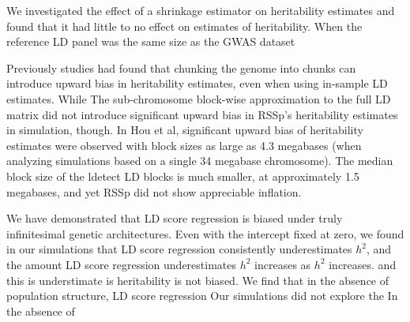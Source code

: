 We investigated the effect of a shrinkage estimator on heritability estimates and found that it had little to no effect on estimates of heritability.  When the reference LD panel was the same size as the GWAS dataset

Previously studies had found that chunking the genome into chunks can introduce upward bias in heritability estimates, even when using in-sample LD estimates\cite{Hou_2019}.  While   The sub-chromosome block-wise approximation to the full LD matrix did not introduce significant upward bias in RSSp's heritability estimates in simulation, though.   In Hou et al, significant upward bias of heritability estimates were observed with block sizes as large as 4.3 megabases (when analyzing simulations based on a single 34 megabase chromosome).  The median block size of the ldetect LD blocks is much smaller, at approximately 1.5 megabases, and yet RSSp did not show appreciable inflation.

We have demonstrated that LD score regression is biased under truly infinitesimal genetic architectures.  Even with the intercept fixed at zero, we found in our simulations
that LD score regression consistently underestimates $h^2$, and the amount LD score regression underestimates $h^2$ increases as $h^2$ increases.
and this is understimate is
heritability is not biased.
We find that in the absence of population structure, LD score regression 
Our simulations did not explore the In the absence of 







